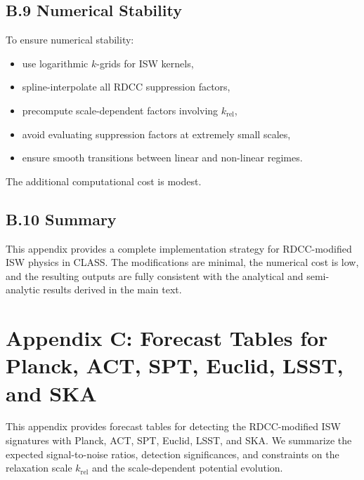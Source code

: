 \documentclass[11pt,a4paper]{article}
\begin{document}
\subsection*{B.9 Numerical Stability}

To ensure numerical stability:

\begin{itemize}
    \item use logarithmic $k$-grids for ISW kernels,
    \item spline-interpolate all RDCC suppression factors,
    \item precompute scale-dependent factors involving $k_{\mathrm{rel}}$,
    \item avoid evaluating suppression factors at extremely small scales,
    \item ensure smooth transitions between linear and non-linear regimes.
\end{itemize}

The additional computational cost is modest.

\subsection*{B.10 Summary}

This appendix provides a complete implementation strategy for RDCC-modified ISW physics in 
CLASS. The modifications are minimal, the numerical cost is low, and the resulting outputs 
are fully consistent with the analytical and semi-analytic results derived in the main text.

\section*{Appendix C: Forecast Tables for Planck, ACT, SPT, Euclid, LSST, and SKA}

This appendix provides forecast tables for detecting the RDCC-modified ISW signatures with 
Planck, ACT, SPT, Euclid, LSST, and SKA. We summarize the expected signal-to-noise ratios, 
detection significances, and constraints on the relaxation scale $k_{\mathrm{rel}}$ and the 
scale-dependent potential evolution.
\end{document}
